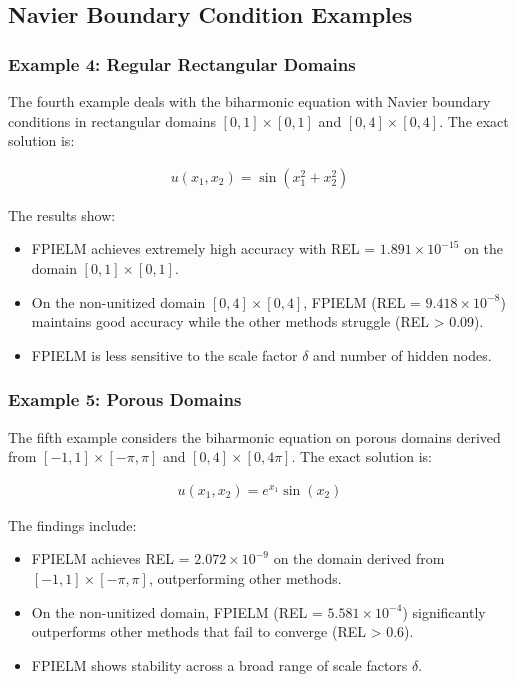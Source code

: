 \documentclass[11pt]{article}
\begin{document}
\subsection{Navier Boundary Condition Examples}

\subsubsection{Example 4: Regular Rectangular Domains}

The fourth example deals with the biharmonic equation with Navier boundary conditions in rectangular domains $[0,1] \times [0,1]$ and $[0,4] \times [0,4]$. The exact solution is:

\begin{align}
    u(x_1, x_2) = \sin(x_1^2 + x_2^2)
\end{align}

The results show:
\begin{itemize}
    \item FPIELM achieves extremely high accuracy with REL = $1.891 \times 10^{-15}$ on the domain $[0,1] \times [0,1]$.
    \item On the non-unitized domain $[0,4] \times [0,4]$, FPIELM (REL = $9.418 \times 10^{-8}$) maintains good accuracy while the other methods struggle (REL > 0.09).
    \item FPIELM is less sensitive to the scale factor $\delta$ and number of hidden nodes.
\end{itemize}

\subsubsection{Example 5: Porous Domains}

The fifth example considers the biharmonic equation on porous domains derived from $[-1,1] \times [-\pi, \pi]$ and $[0,4] \times [0,4\pi]$. The exact solution is:

\begin{align}
    u(x_1, x_2) = e^{x_1} \sin(x_2)
\end{align}

The findings include:
\begin{itemize}
    \item FPIELM achieves REL = $2.072 \times 10^{-9}$ on the domain derived from $[-1,1] \times [-\pi, \pi]$, outperforming other methods.
    \item On the non-unitized domain, FPIELM (REL = $5.581 \times 10^{-4}$) significantly outperforms other methods that fail to converge (REL > 0.6).
    \item FPIELM shows stability across a broad range of scale factors $\delta$.
\end{itemize}
\end{document}
